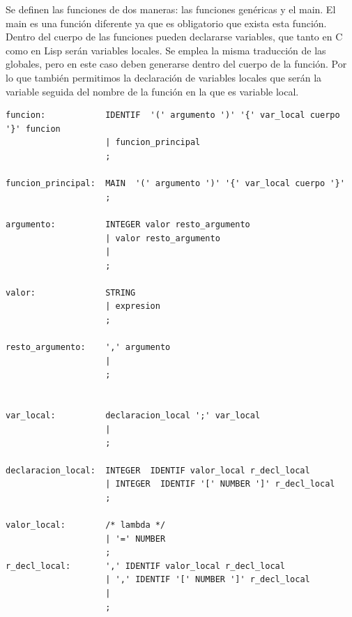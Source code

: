 \documentclass[12pt,a4paper]{article}
\begin{document}
\noindent Se definen las funciones de dos maneras: las funciones genéricas y el main. El main es una función 
diferente ya que es obligatorio que exista esta función. 
\noindent Dentro del cuerpo de las funciones pueden declararse variables,
que tanto en C como en Lisp serán variables locales. Se emplea la misma traducción
de las globales, pero en este caso deben generarse dentro del cuerpo de la función.
Por lo que también permitimos la declaración de variables locales que serán la variable 
seguida del nombre de la función en la que es variable local.
\begin{lstlisting}
funcion:            IDENTIF  '(' argumento ')' '{' var_local cuerpo '}' funcion  
                    | funcion_principal                                            
                    ;

funcion_principal:  MAIN  '(' argumento ')' '{' var_local cuerpo '}'               
                    ;

argumento:          INTEGER valor resto_argumento                    
                    | valor resto_argumento                       
                    |                                               
                    ;

valor:              STRING                                           
                    | expresion                                      
                    ;

resto_argumento:    ',' argumento                                 
                    |                                              
                    ;   


var_local:          declaracion_local ';' var_local               
                    |                                              
                    ;

declaracion_local:  INTEGER  IDENTIF valor_local r_decl_local       
                    | INTEGER  IDENTIF '[' NUMBER ']' r_decl_local  
                    ;

valor_local:        /* lambda */                                    
                    | '=' NUMBER                                    
                    ;
r_decl_local:       ',' IDENTIF valor_local r_decl_local            
                    | ',' IDENTIF '[' NUMBER ']' r_decl_local        
                    |                                              
                    ;
\end{lstlisting}
\end{document}
